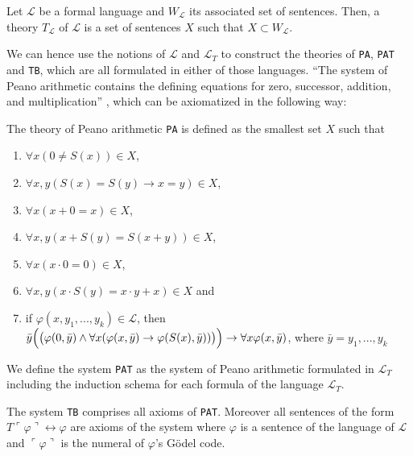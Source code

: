 \begin{definition}[theory]\label{def:theory}
  Let $\mathcal{L}$ be a formal language and $W_{\mathcal{L}}$ its associated set of sentences. Then, a theory $T_{\mathcal{L}}$ of $\mathcal{L}$ is a set of sentences $X$ such that $X \subset W_{\mathcal{L}}$.
\end{definition}

We can hence use the notions of $\mathcal{L}$ and $\mathcal{L}_T$ to construct the theories of \texttt{PA}, \texttt{PAT} and \texttt{TB}, which are all formulated in either of those languages. ``The system of Peano arithmetic contains the defining equations for zero, successor, addition, and multiplication'' \cite[p. 30]{halbach:2011}, which can be axiomatized in the following way: 
\begin{definition}
    The theory of Peano arithmetic \texttt{PA} is defined as the smallest set $X$ such that
    \begin{enumerate}
        \item $\forall x (0 \not = S(x)) \in X$, 
        \item $\forall x,y (S(x) = S(y) \rightarrow x = y) \in X$,
        \item $\forall x(x + 0 = x) \in X$,
        \item $\forall x,y(x + S(y) = S(x+y)) \in X$,
        \item $\forall x(x \cdot 0 = 0) \in X$,
        \item $\forall x,y(x \cdot S(y) = x \cdot y + x) \in X$ and
        \item if $\varphi(x,y_1,...,y_k) \in \mathcal{L}$, then $\bar y \Bigl( \bigl(\varphi(0,\bar y) \land \forall x (\varphi(x,\bar y) \to \varphi(S(x),\bar y))\bigr)\Bigr) \to \forall x \varphi(x, \bar y)$, where $\bar y = y_1,...,y_k$
    \end{enumerate}
\end{definition}

\begin{definition}
    We define the system \texttt{PAT} as the system of Peano arithmetic formulated in $\mathcal{L}_T$ including the induction schema for each formula of the language $\mathcal{L}_T$.
\end{definition}

\begin{definition}[\texttt{TB}]
    The system \texttt{TB} comprises all axioms of \texttt{PAT}. Moreover all sentences of the form $T\ulcorner\varphi\urcorner \leftrightarrow \varphi$ are axioms of the system where $\varphi$ is a sentence of the language of $\mathcal{L}$ and $\ulcorner \varphi \urcorner$ is the numeral of $\varphi$'s Gödel code.
\end{definition}

